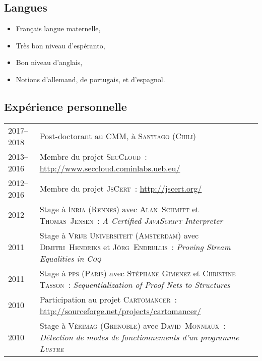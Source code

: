 \documentclass[12pt,a4paper]{article}
\makeatletter
\newcommand{\en}[1]{\foreignlanguage{english}{\textit{#1}}}
\newenvironment{datecvsection}[1]%
               {\subsection*{#1}%
                 \noindent \begin{tabular}{@{}p{\annee}p{\texte}@{}}}
               {\end{tabular}}
\newenvironment{cvsection}[1]%
               {\subsection*{#1}}
               {}
\makeatother
\begin{document}
\begin{cvsection}{Langues}
\parbox{.45\textwidth}{
\begin{itemize}
   \item Français langue maternelle,
   \item Très bon niveau d’espéranto,
\end{itemize}}
\parbox{.45\textwidth}{
\begin{itemize}
   \item Bon niveau d’anglais,
   \item Notions d’allemand, de portugais, et d’espagnol.
\end{itemize}}
\end{cvsection}

\begin{datecvsection}{Expérience personnelle}

    2017–2018 & Post-doctorant au \textsc{CMM}, à \textsc{Santiago} (\textsc{Chili}) \\

	2013–2016 & Membre du projet \textsc{SecCloud}~:  \url{http://www.seccloud.cominlabs.ueb.eu/} \\

	2012–2016 & Membre du projet \textsc{JsCert}~:  \url{http://jscert.org/} \\

	2012 & Stage à \textsc{Inria} (\textsc{Rennes}) avec \textsc{Alan~Schmitt} et \textsc{Thomas~Jensen}~:
	\en{\textit{A Certified \textsc{JavaScript} Interpreter}} \\

	2011 & Stage à \textsc{Vrĳe Universiteit} (\textsc{Amsterdam}) avec \textsc{Dimitri~Hendriks} et \textsc{Jörg~Endrullis}~:
	\en{\textit{Proving Stream Equalities in \textsc{Coq}}} \\

	2011 & Stage à \textsc{pps} (\textsc{Paris}) avec \textsc{Stéphane Gimenez} et \textsc{Christine Tasson}~:
	\en{\textit{Sequentialization of Proof Nets to Structures}} \\

	2010 & Participation au projet \textsc{Cartomancer}~:  \url{http://sourceforge.net/projects/cartomancer/} \\

	2010 & Stage à \textsc{Vérimag} (\textsc{Grenoble}) avec \textsc{David~Monniaux}~:
	\textit{Détection de modes de fonctionnements d’un programme \textsc{Lustre}} \\

\end{datecvsection}
\end{document}
